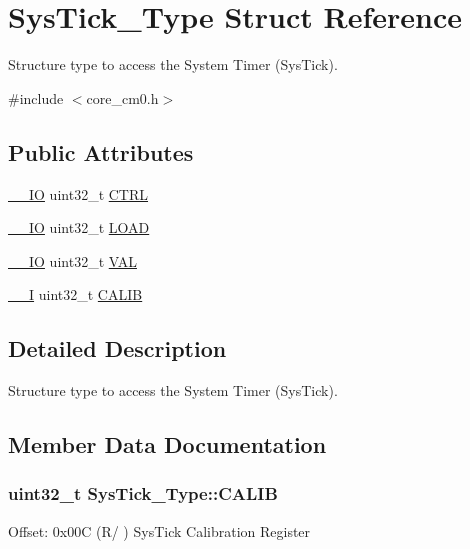 \hypertarget{struct_sys_tick___type}{}\section{Sys\+Tick\+\_\+\+Type Struct Reference}
\label{struct_sys_tick___type}


Structure type to access the System Timer (Sys\+Tick).  




{\ttfamily \#include $<$core\+\_\+cm0.\+h$>$}

\subsection*{Public Attributes}
\begin{DoxyCompactItemize}
\item 
\hyperlink{core__sc300_8h_aec43007d9998a0a0e01faede4133d6be}{\+\_\+\+\_\+\+IO} uint32\+\_\+t \hyperlink{struct_sys_tick___type_af2ad94ac83e5d40fc6e34884bc1bec5f}{C\+T\+RL}
\item 
\hyperlink{core__sc300_8h_aec43007d9998a0a0e01faede4133d6be}{\+\_\+\+\_\+\+IO} uint32\+\_\+t \hyperlink{struct_sys_tick___type_ae7bc9d3eac1147f3bba8d73a8395644f}{L\+O\+AD}
\item 
\hyperlink{core__sc300_8h_aec43007d9998a0a0e01faede4133d6be}{\+\_\+\+\_\+\+IO} uint32\+\_\+t \hyperlink{struct_sys_tick___type_a0997ff20f11817f8246e8f0edac6f4e4}{V\+AL}
\item 
\hyperlink{core__sc300_8h_af63697ed9952cc71e1225efe205f6cd3}{\+\_\+\+\_\+I} uint32\+\_\+t \hyperlink{struct_sys_tick___type_a9c9eda0ea6f6a7c904d2d75a6963e238}{C\+A\+L\+IB}
\end{DoxyCompactItemize}


\subsection{Detailed Description}
Structure type to access the System Timer (Sys\+Tick). 

\subsection{Member Data Documentation}
\subsubsection[{\texorpdfstring{C\+A\+L\+IB}{CALIB}}]{ uint32\+\_\+t Sys\+Tick\+\_\+\+Type\+::\+C\+A\+L\+IB}\hypertarget{struct_sys_tick___type_a9c9eda0ea6f6a7c904d2d75a6963e238}{}\label{struct_sys_tick___type_a9c9eda0ea6f6a7c904d2d75a6963e238}
Offset\+: 0x00C (R/ ) Sys\+Tick Calibration Register 
